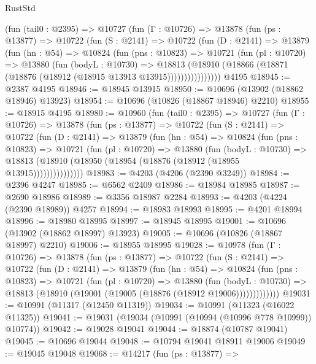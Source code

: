 \begin{lexlean}{RustStd}
\begin{coremodule}
      (fun (tail0 : @2395) =>
      @10727
        (fun (Γ : @10726) =>
        @13878
          (fun (ps : @13877) =>
          @10722
            (fun (S : @2141) =>
            @10722
              (fun (D : @2141) =>
              @13879
                (fun (hn : @54) =>
                @10824
                  (fun (pns : @10823) =>
                  @10721
                    (fun (pl : @10720) =>
                    @13880
                      (fun (bodyL : @10730) =>
                      @18813
                        (@18910
                          (@18866 (@18871 (@18876 (@18912 (@18915 @13913 @13915))))))))))))))))
    @4195
@18945 := @2387 @4195
@18946 := @18945 @13915
@18950 := @10696 (@13902 (@18862 @18946) @13923)
@18954 := @10696 (@10826 (@18867 @18946) @2210)
@18955 := @18915 @4195
@18980 := @10960
    (fun (tail0 : @2395) =>
    @10727
      (fun (Γ : @10726) =>
      @13878
        (fun (ps : @13877) =>
        @10722
          (fun (S : @2141) =>
          @10722
            (fun (D : @2141) =>
            @13879
              (fun (hn : @54) =>
              @10824
                (fun (pns : @10823) =>
                @10721
                  (fun (pl : @10720) =>
                  @13880
                    (fun (bodyL : @10730) =>
                    @18813 (@18910 (@18950 (@18954 (@18876 (@18912 (@18955 @13915)))))))))))))))
@18983 := @4203 (@4206 (@2390 @3249))
@18984 := @2396 @4247
@18985 := @6562 @2409
@18986 := @18984 @18985
@18987 := @2690 @18986
@18989 := @3356 @18987 @2284
@18993 := @4203 (@4224 (@2390 @18989)) @4257
@18994 := @18983 @18993
@18995 := @4201 @18994
@18996 := @18980 @18995
@18997 := @18945 @18995
@19001 := @10696 (@13902 (@18862 @18997) @13923)
@19005 := @10696 (@10826 (@18867 @18997) @2210)
@19006 := @18955 @18995
@19028 := @10978
    (fun (Γ : @10726) =>
    @13878
      (fun (ps : @13877) =>
      @10722
        (fun (S : @2141) =>
        @10722
          (fun (D : @2141) =>
          @13879
            (fun (hn : @54) =>
            @10824
              (fun (pns : @10823) =>
              @10721
                (fun (pl : @10720) =>
                @13880
                  (fun (bodyL : @10730) =>
                  @18813 (@18910 (@19001 (@19005 (@18876 (@18912 @19006)))))))))))))
@19031 := @10991 (@11317 (@12450 @11319))
@19034 := @10991 (@11323 (@16022 @11325))
@19041 := @19031 (@19034 (@10991 (@10994 (@10996 @778 @10999)) @10774))
@19042 := @19028 @19041
@19044 := @18874 (@10787 @19041)
@19045 := @10696 @19044
@19048 := @10794 @19041 @18911 @19006
@19049 := @19045 @19048
@19068 := @14217
    (fun (ps : @13877) =>

\end{coremodule}
\end{lexlean}
